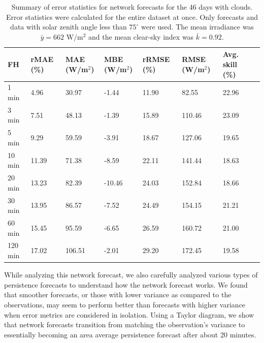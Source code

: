 \begin{table}
\centering
\caption{Summary of error statistics for network forecasts for the 46 days with clouds. Error statistics were calculated for the entire dataset at once. Only forecasts and data with solar zenith angle less than $75^\circ$ were used. The mean irradiance was $\bar{y} = 662 \mbox{ W/m$^2$}$ and the mean clear-sky index was $\bar{k} = 0.92$.}
\begin{tabular}{llllllll}
\toprule
FH &  rMAE (\%) &  MAE (W/m$^2$) &  MBE (W/m$^2$) &  rRMSE (\%) &  RMSE (W/m$^2$) &  Avg. skill (\%) \\
\midrule
 1 min  &      4.96 &          30.97 &          -1.44 &      11.90 &           82.55 &           22.96 \\
 3 min  &      7.51 &          48.13 &          -1.39 &      15.89 &          110.46 &           23.09 \\
 5 min  &      9.29 &          59.59 &          -3.91 &      18.67 &          127.06 &           19.65 \\
10 min  &     11.39 &          71.38 &          -8.59 &      22.11 &          141.44 &           18.63 \\
20 min  &     13.23 &          82.39 &         -10.46 &      24.03 &          152.84 &           18.66 \\
30 min  &     13.95 &          86.57 &          -7.52 &      24.49 &          154.15 &           21.21 \\
60 min  &     15.45 &          95.59 &          -6.65 &      26.59 &          160.72 &           21.00 \\
120 min &     17.02 &         106.51 &          -2.01 &      29.20 &          172.45 &           19.58 \\
\bottomrule
\end{tabular}
\label{table:network_errors_cloudy}
\end{table}




While analyzing this network forecast, we also carefully analyzed
various types of persistence forecasts to understand how the network
forecast works.
We found that smoother forecasts, or those with lower variance as
compared to the observations, may seem to perform better than
forecasts with higher variance when error metrics are considered in
isolation.
Using a Taylor diagram, we show that network forecasts transition from
matching the observation's variance to essentially becoming an area
average persistence forecast after about 20 minutes.

